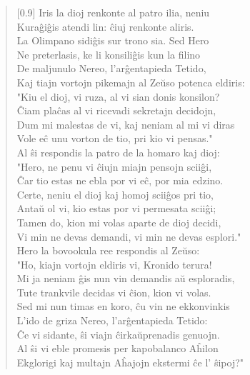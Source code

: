\begin{verse}[0.9\textwidth]
          Iris la dioj renkonte al patro ilia, neniu\\
          Kura\^gi\^gis atendi lin: \^ciuj renkonte aliris.\\
          \vin   La Olimpano sidi\^gis sur trono sia. Sed Hero\\
          Ne preterlasis, ke li konsili\^gis kun la filino\\
          De maljunulo Nereo, l'ar\^gentapieda Tetido,\\
          Kaj tiajn vortojn pikemajn al Ze\u uso potenca eldiris:\\
          \vin   "Kiu el dioj, vi ruza, al vi sian donis konsilon?\\
          \^Ciam pla\^cas al vi ricevadi sekretajn decidojn,\\
          Dum mi malestas de vi, kaj neniam al mi vi diras\\
          Vole e\^c unu vorton de tio, pri kio vi pensas."\\
          \vin   Al \^si respondis la patro de la homaro kaj dioj:\\
          "Hero, ne penu vi \^ciujn miajn pensojn scii\^gi,\\
          \^Car tio estas ne ebla por vi e\^c, por mia edzino.\\
          Certe, neniu el dioj kaj homoj scii\^gos pri tio,\\
          Anta\u u ol vi, kio estas por vi permesata scii\^gi;\\
          Tamen do, kion mi volas aparte de dioj decidi,\\
          Vi min ne devas demandi, vi min ne devas esplori."\\
          \vin   Hero la bovookula ree respondis al Ze\u uso:\\
          "Ho, kiajn vortojn eldiris vi, Kronido terura!\\
          Mi ja neniam \^gis nun vin demandis a\u u esploradis,\\
          Tute trankvile decidas vi \^cion, kion vi volas.\\
          Sed mi nun timas en koro, \^cu vin ne ekkonvinkis\\
          L'ido de griza Nereo, l'ar\^gentapieda Tetido:\\
          \^Ce vi sidante, \^si viajn \^cirka\u uprenadis genuojn.\\
          Al \^si vi eble promesis per kapobalanco A\^hilon\\
          Ekglorigi kaj multajn A\^hajojn ekstermi \^ce l' \^sipoj?"\\

\end{verse}
